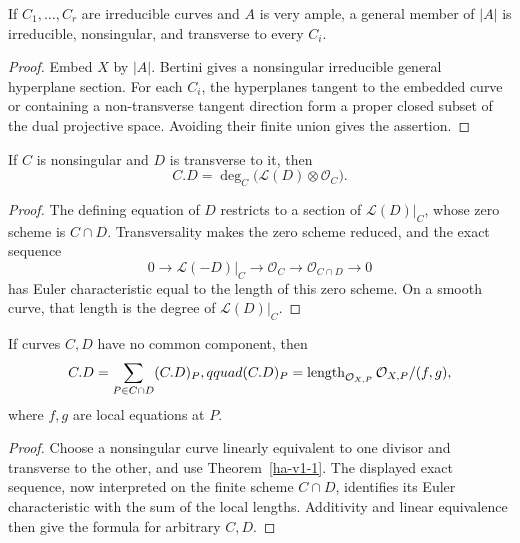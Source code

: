 \begin{lemma}
\label{ha-v1-2}
If \(C_1,\ldots,C_r\) are irreducible curves and \(A\) is very ample, a general
member of \(|A|\) is irreducible, nonsingular, and transverse to every \(C_i\).

\end{lemma}
\begin{proof}
Embed \(X\) by \(|A|\).  Bertini gives a nonsingular irreducible general
hyperplane section.  For each \(C_i\), the hyperplanes tangent to the embedded
curve or containing a non-transverse tangent direction form a proper closed
subset of the dual projective space.  Avoiding their finite union gives the
assertion.
\end{proof}

\begin{lemma}
\label{ha-v1-3}
If \(C\) is nonsingular and \(D\) is transverse to it, then
\[
 C.D=\deg_C\bigl(\mathcal L(D)\otimes\mathcal O_C\bigr).
\]

\end{lemma}
\begin{proof}
The defining equation of \(D\) restricts to a section of
\(\mathcal L(D)|_C\), whose zero scheme is \(C\cap D\).  Transversality makes
the zero scheme reduced, and the exact sequence
\[
0\to\mathcal L(-D)|_C\to\mathcal O_C\to\mathcal O_{C\cap D}\to0
\]
has Euler characteristic equal to the length of this zero scheme.  On a smooth
curve, that length is the degree of \(\mathcal L(D)|_C\).
\end{proof}

\begin{proposition}
\label{ha-v1-4}
If curves \(C,D\) have no common component, then
\[
 C.D=\sum_{P\in C\cap D}(C.D)_P,qquad
 (C.D)_P=\operatorname{length}_{\mathcal O_{X,P}}\mathcal O_{X,P}/(f,g),
\]
where \(f,g\) are local equations at \(P\).
\end{proposition}
\begin{proof}
Choose a nonsingular curve linearly equivalent to one divisor and transverse
to the other, and use Theorem~\ref{ha-v1-1}.  The displayed exact sequence,
now interpreted on the finite scheme \(C\cap D\), identifies its Euler
characteristic with the sum of the local lengths.  Additivity and linear
equivalence then give the formula for arbitrary \(C,D\).
\end{proof}

